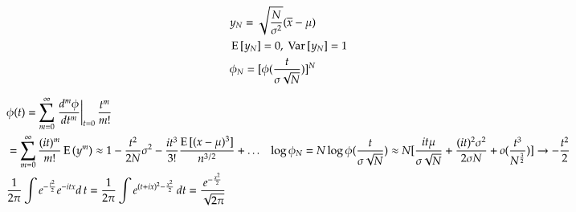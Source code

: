 \documentclass[main.tex]{subfiles}
\begin{document}
\begin{align*}
&y_N=\sqrt{\frac{N}{\sigma^2}}(\overline{x}-\mu)\\
&\operatorname{E}{[y_N]}=0,\ \operatorname{Var}{[y_N]}=1\\
&\phi_N=[\phi(\frac{t}{\sigma\sqrt{N}})]^N
\end{align*}

\begin{align*}
&\phi(t)=\sum_{m=0}^{\infty}\left.\frac{d^m\phi}{dt^m}\right|_{t=0}\frac{t^m}{m!}\\
&=\sum_{m=0}^{\infty}\frac{(it)^m}{m!}\operatorname{E}{(y^m)}\approx1-\frac{t^2}{2N}\sigma^2-\frac{it^3}{3!}\frac{\operatorname{E}{[(x-\mu)^3]}}{n^{3/2}}+\ldots
&\log{\phi_N}=N\log{\phi(\frac{t}{\sigma\sqrt{N}})}\approx N[\frac{it\mu}{\sigma\sqrt{N}}+\frac{(it)^2\sigma^2}{2\sigma N}+o(\frac{t^3}{N^{\frac{3}{2}}})]\to-\frac{t^2}{2}\\
&\frac{1}{2\pi}\int e^{-\frac{t^2}{2}}e^{-itx}d\,t=\frac{1}{2\pi}\int e^{(t+ix)^2-\frac{x^2}{2}}\,dt=\frac{e^{-\frac{x^2}{2}}}{\sqrt{2\pi}}
\end{align*}
\end{document}
